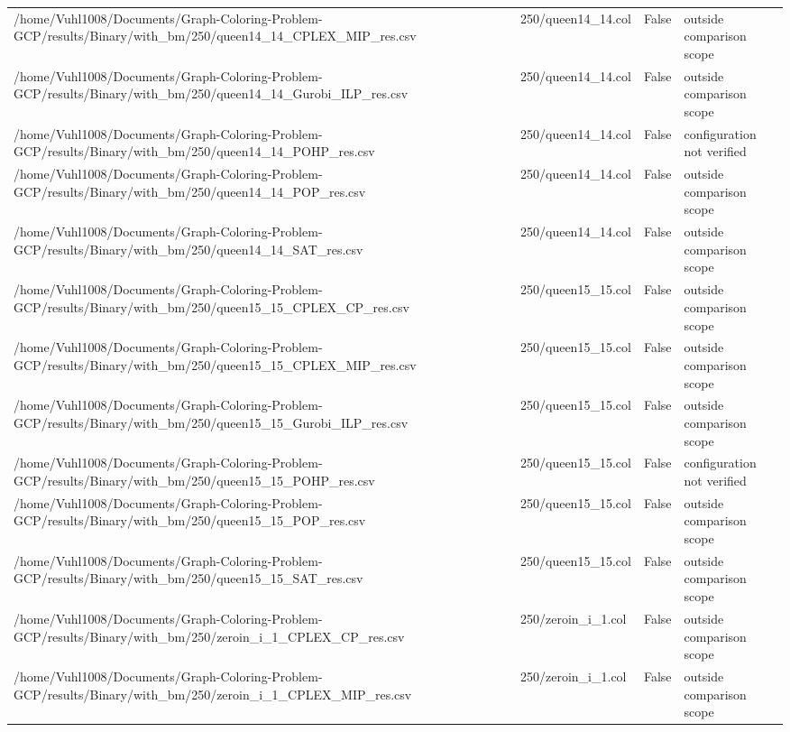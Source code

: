 \begin{table}[htbp]
\begin{tabular}{llll}
/home/Vuhl1008/Documents/Graph-Coloring-Problem-GCP/results/Binary/with\_bm/250/queen14\_14\_CPLEX\_MIP\_res.csv & 250/queen14\_14.col & False & outside comparison scope \\
/home/Vuhl1008/Documents/Graph-Coloring-Problem-GCP/results/Binary/with\_bm/250/queen14\_14\_Gurobi\_ILP\_res.csv & 250/queen14\_14.col & False & outside comparison scope \\
/home/Vuhl1008/Documents/Graph-Coloring-Problem-GCP/results/Binary/with\_bm/250/queen14\_14\_POHP\_res.csv & 250/queen14\_14.col & False & configuration not verified \\
/home/Vuhl1008/Documents/Graph-Coloring-Problem-GCP/results/Binary/with\_bm/250/queen14\_14\_POP\_res.csv & 250/queen14\_14.col & False & outside comparison scope \\
/home/Vuhl1008/Documents/Graph-Coloring-Problem-GCP/results/Binary/with\_bm/250/queen14\_14\_SAT\_res.csv & 250/queen14\_14.col & False & outside comparison scope \\
/home/Vuhl1008/Documents/Graph-Coloring-Problem-GCP/results/Binary/with\_bm/250/queen15\_15\_CPLEX\_CP\_res.csv & 250/queen15\_15.col & False & outside comparison scope \\
/home/Vuhl1008/Documents/Graph-Coloring-Problem-GCP/results/Binary/with\_bm/250/queen15\_15\_CPLEX\_MIP\_res.csv & 250/queen15\_15.col & False & outside comparison scope \\
/home/Vuhl1008/Documents/Graph-Coloring-Problem-GCP/results/Binary/with\_bm/250/queen15\_15\_Gurobi\_ILP\_res.csv & 250/queen15\_15.col & False & outside comparison scope \\
/home/Vuhl1008/Documents/Graph-Coloring-Problem-GCP/results/Binary/with\_bm/250/queen15\_15\_POHP\_res.csv & 250/queen15\_15.col & False & configuration not verified \\
/home/Vuhl1008/Documents/Graph-Coloring-Problem-GCP/results/Binary/with\_bm/250/queen15\_15\_POP\_res.csv & 250/queen15\_15.col & False & outside comparison scope \\
/home/Vuhl1008/Documents/Graph-Coloring-Problem-GCP/results/Binary/with\_bm/250/queen15\_15\_SAT\_res.csv & 250/queen15\_15.col & False & outside comparison scope \\
/home/Vuhl1008/Documents/Graph-Coloring-Problem-GCP/results/Binary/with\_bm/250/zeroin\_i\_1\_CPLEX\_CP\_res.csv & 250/zeroin\_i\_1.col & False & outside comparison scope \\
/home/Vuhl1008/Documents/Graph-Coloring-Problem-GCP/results/Binary/with\_bm/250/zeroin\_i\_1\_CPLEX\_MIP\_res.csv & 250/zeroin\_i\_1.col & False & outside comparison scope \\

\end{tabular}
\end{table}
